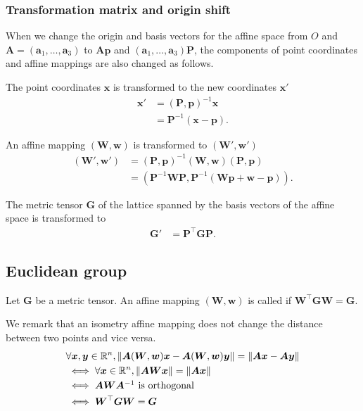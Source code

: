 \subsubsection{Transformation matrix and origin shift}

When we change the origin and basis vectors for the affine space from $O$ and $\bm{A} = (\bm{a}_{1}, \dots, \bm{a}_{3})$ to $\bm{Ap}$ and $(\bm{a}_{1}, \dots, \bm{a}_{3})\bm{P}$, the components of point coordinates and affine mappings are also changed as follows.

The point coordinates $\bm{x}$ is transformed to the new coordinates $\bm{x}'$
\begin{align}
  \bm{x}'
  &= (\bm{P}, \bm{p})^{-1} \bm{x} \nonumber \\
  &= \bm{P}^{-1} ( \bm{x} - \bm{p} ).
\end{align}

An affine mapping $(\bm{W}, \bm{w})$ is transformed to $(\bm{W}', \bm{w}')$
\begin{align}
  \label{eq:operation_transformation}
  (\bm{W}', \bm{w}')
  &= (\bm{P}, \bm{p})^{-1} (\bm{W}, \bm{w}) (\bm{P}, \bm{p}) \nonumber \\
  &= \left( \bm{P}^{-1} \bm{W} \bm{P}, \bm{P}^{-1}(\bm{Wp} + \bm{w} - \bm{p}) \right).
\end{align}

The metric tensor $\bm{G}$ of the lattice spanned by the basis vectors of the affine space is transformed to
\begin{align}
  \bm{G}' &= \bm{P}^{\top} \bm{GP}.
\end{align}


\subsection{Euclidean group}

\begin{screen}
  \begin{defn}[isometry]
    Let $\bm{G}$ be a metric tensor.
    An affine mapping $(\bm{W}, \bm{w})$ is called  if $\bm{W}^{\top} \bm{G} \bm{W} = \bm{G}$.
  \end{defn}
\end{screen}

We remark that an isometry affine mapping does not change the distance between two points and vice versa.
\begin{align*}
  &\forall \bm{x}, \bm{y} \in \mathbb{R}^{n}, \left\lVert \bm{A} (\bm{W}, \bm{w}) \bm{x} - \bm{A} (\bm{W}, \bm{w}) \bm{y}\right\rVert = \left\lVert\bm{Ax} - \bm{Ay}\right\rVert \\
  &\iff \forall \bm{x} \in \mathbb{R}^{n}, \left\lVert \bm{AW} \bm{x} \right\rVert = \left\lVert\bm{Ax}\right\rVert \\
  &\iff \mbox{$\bm{A} \bm{W} \bm{A}^{-1}$ is orthogonal} \\
  &\iff \bm{W}^{\top} \bm{G} \bm{W} = \bm{G}
\end{align*}

